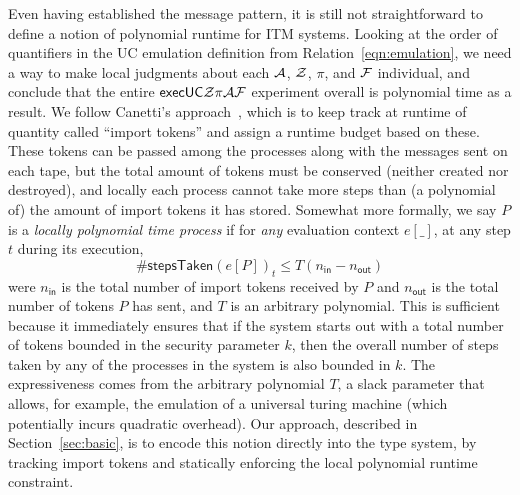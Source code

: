 Even having established the message pattern, it is still not straightforward to define a notion of polynomial runtime for ITM systems.
Looking at the order of quantifiers in the UC emulation definition from Relation~\ref{eqn:emulation}, we need a way to make local judgments about each $\mathcal{A}$, $\mathcal{Z}$, $\pi$, and $\mathcal{F}$ individual, and conclude that the entire ${\mathsf {execUC}} \mathcal{Z} \pi \mathcal{A} \mathcal{F}$ experiment overall is polynomial time as a result.
We follow Canetti's approach~\cite{canettiUC}, which is to keep track at runtime of quantity called ``import tokens'' and assign a runtime budget based on these.
These tokens can be passed among the processes along with the messages sent on each tape, but the total amount of tokens must be conserved (neither created nor destroyed), and locally each process cannot take more steps than (a polynomial of) the amount of import tokens it has stored.
Somewhat more formally, we say $P$ is a \emph{locally polynomial time process} if for \emph{any} evaluation context $e[\_]$, at any step $t$ during its execution,
\[
\#\textsf{stepsTaken}(e[P])_{t} \le T(n_{\textsf{in}} - n_{\textsf{out}})
\]
were $n_{\textsf{in}}$ is the total number of import tokens received by $P$ and $n_{\textsf{out}}$ is the total number of tokens $P$ has sent, and $T$ is an arbitrary polynomial.
This is sufficient because it immediately ensures that if the system starts out with a total number of tokens bounded in the security parameter $k$, then the overall number of steps taken by any of the processes in the system is also bounded in $k$.
The expressiveness comes from the arbitrary polynomial $T$, a slack parameter that allows, for example, the emulation of a universal turing machine (which potentially incurs quadratic overhead).
Our approach, described in Section~\ref{sec:basic}, is to encode this notion directly into the type system, by tracking import tokens and statically enforcing the local polynomial runtime constraint.


